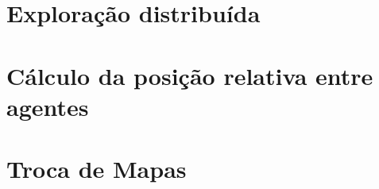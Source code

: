 \section{Exploração distribuída}
\section{Cálculo da posição relativa entre agentes}
\section{Troca de Mapas}
